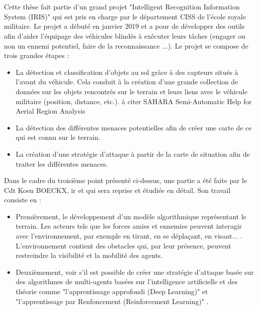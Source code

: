 \chapter{}
\section{}

Cette thèse fait partie d'un grand projet "Intelligent Recognition Information System (IRIS)" qui est pris en charge par le département CISS de l'école royale militaire. Le projet a débuté en janvier 2019 et a pour de développer des outils afin d'aider l'équipage des véhicules blindés à exécuter leurs tâches (engager ou non un ennemi potentiel, faire de la reconnaissance ...). Le projet se compose de trois grandes étapes : 
\begin{itemize}
    \item La détection et classification d'objets au sol grâce à des capteurs situés à l'avant du véhicule. Cela conduit à la création d'une grande collection de données sur les objets rencontrés sur le terrain et leurs liens avec le véhicule militaire (position, distance, etc.). {à citer SAHARA
Semi-Automatic Help for Aerial Region Analysis}
    \item La détection des différentes menaces potentielles afin de créer une carte de ce qui est connu sur le terrain.
    \item La création d'une stratégie d'attaque à partir de la carte de situation afin de traiter les différentes menaces.
\end{itemize}

Dans le cadre du troisième point présenté ci-dessus, une partie a été faite par le Cdt Koen BOECKX, ir et qui sera reprise et étudiée en détail. Son travail consiste en : 
\begin{itemize}
    \item Premièrement, le développement d'un modèle algorithmique représentant le terrain. Les acteurs tels que les forces amies et ennemies peuvent interagir avec l'environnement, par exemple en tirant, en se déplaçant, en visant... . L'environnement contient des obstacles qui, par leur présence, peuvent restreindre la visibilité et la mobilité des agents. 
    \item Deuxièmement, voir s'il est possible de créer une stratégie d'attaque basée sur des algorithmes de multi-agents basées sur l'intelligence artificielle et des théorie comme "l'apprentissage approfondi (Deep Learning)" et "l'apprentissage par Renfoncement (Reinforcement Learning)" .
\end{itemize}







